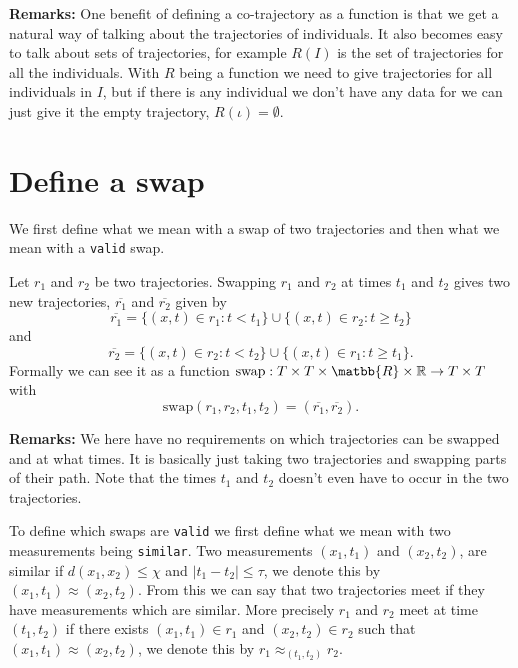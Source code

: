 \documentclass[11pt]{article}
\begin{document}
\textbf{Remarks:} One benefit of defining a co-trajectory as a function is
 that we get a natural way of talking about the trajectories of
 individuals. It also becomes easy to talk about sets of trajectories,
 for example \(R(I)\) is the set of trajectories for all the
 individuals. With \(R\) being a function we need to give trajectories
 for all individuals in \(I\), but if there is any individual we don't
 have any data for we can just give it the empty trajectory,
 \(R(\iota) = {\emptyset}\).
\section{Define a swap}
\label{sec:orge90c233}
We first define what we mean with a swap of two trajectories and then
what we mean with a \texttt{valid} swap.

Let \(r_1\) and \(r_2\) be two trajectories. Swapping \(r_1\) and
\(r_2\) at times \(t_1\) and \(t_2\) gives two new trajectories,
\(\overline{r_1}\) and \(\overline{r_2}\) given by
\begin{equation}
  \overline{r_1} = \{(x, t) \in r_1: t < t_1\} \cup \{(x, t) \in r_2: t \geq t_2\}
\end{equation}
and
\begin{equation}
  \overline{r_2} = \{(x, t) \in r_2: t < t_2\} \cup \{(x, t) \in r_1: t \geq t_1\}.
\end{equation}
Formally we can see it as a function \(\textrm{swap}: T \times T
\times \matbb{R} \times \mathbb{R} \to T \times T\) with
\begin{equation}
  \textrm{swap}(r_1, r_2, t_1, t_2) = (\overline{r_1}, \overline{r_2}).
\end{equation}

\textbf{Remarks:} We here have no requirements on which trajectories can be
swapped and at what times. It is basically just taking two
trajectories and swapping parts of their path. Note that the times
\(t_1\) and \(t_2\) doesn't even have to occur in the two
trajectories.

To define which swaps are \texttt{valid} we first define what we mean with
two measurements being \texttt{similar}. Two measurements \((x_1, t_1)\) and
\((x_2, t_2)\), are similar if \(d(x_1, x_2) \leq \chi\) and \(|t_1 -
t_2| \leq \tau\), we denote this by \((x_1, t_1) \approx (x_2, t_2)\).
From this we can say that two trajectories meet if they have
measurements which are similar. More precisely \(r_1\) and \(r_2\)
meet at time \((t_1, t_2)\) if there exists \((x_1, t_1) \in r_1\) and
\((x_2, t_2) \in r_2\) such that \((x_1, t_1) \approx (x_2, t_2)\), we
denote this by \(r_1 \approx_{(t_1, t_2)} r_2\).
\end{document}
